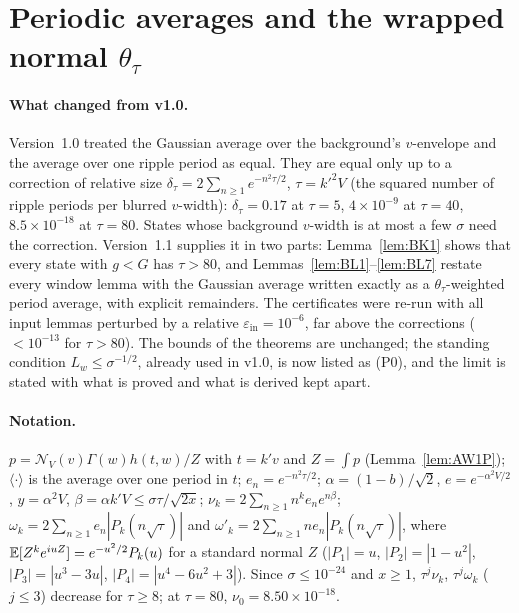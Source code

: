 \section{Periodic averages and the wrapped normal $\theta_\tau$}
\label{app:theta}

\paragraph*{What changed from v1.0.}
Version~1.0 treated the Gaussian average over the background's $v$-envelope and the average over one ripple period as equal. They are equal
only up to a correction of relative size $\delta_\tau=2\sum_{n\ge1}e^{-n^2\tau/2}$, $\tau=k'^2V$ (the squared number of ripple periods per
blurred $v$-width): $\delta_\tau=0.17$ at $\tau=5$, $4\times10^{-9}$ at $\tau=40$, $8.5\times10^{-18}$ at $\tau=80$. States whose background $v$-width
is at most a few $\sigma$ need the correction. Version~1.1 supplies it in two parts: Lemma~\ref{lem:BK1} shows that every state with $g<G$
has $\tau>80$, and Lemmas~\ref{lem:BL1}--\ref{lem:BL7} restate every window lemma with the Gaussian average written exactly as a
$\theta_\tau$-weighted period average, with explicit remainders. The certificates were re-run with all input lemmas perturbed by a
relative $\varepsilon_{\mathrm{in}}=10^{-6}$, far above the corrections ($<10^{-13}$ for $\tau>80$). The bounds of the theorems are unchanged; the standing condition $L_w\le\sigma^{-1/2}$, already used in v1.0, is now listed as (P0), and the limit is stated with what is proved and what is derived kept apart.

\paragraph*{Notation.}
$p=\mathcal N_V(v)\Gamma(w)h(t,w)/Z$ with $t=k'v$ and $Z=\int p$ (Lemma~\ref{lem:AW1P}); $\langle\cdot\rangle$ is the average over one period in $t$;
$e_n=e^{-n^2\tau/2}$; $\alpha=(1-b)/\sqrt2$, $e=e^{-\alpha^2V/2}$, $y=\alpha^2V$, $\beta=\alpha k'V\le\sigma\tau/\sqrt{2x}$; $\nu_k=2\sum_{n\ge1}n^ke_ne^{n\beta}$;
$\omega_k=2\sum_{n\ge1}e_n|P_k(n\sqrt\tau)|$ and $\omega'_k=2\sum_{n\ge1}ne_n|P_k(n\sqrt\tau)|$, where $\mathbb{E}[Z^ke^{iuZ}]=e^{-u^2/2}P_k(u)$ for a standard normal $Z$
($|P_1|=u$, $|P_2|=|1-u^2|$, $|P_3|=|u^3-3u|$, $|P_4|=|u^4-6u^2+3|$). Since $\sigma\le10^{-24}$ and $x\ge1$, $\tau^j\nu_k$, $\tau^j\omega_k$ ($j\le3$) decrease
for $\tau\ge8$; at $\tau=80$, $\nu_0=8.50\times10^{-18}$.

